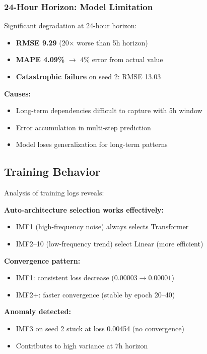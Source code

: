 \documentclass[11pt,a4paper]{article}
\begin{document}
\subsubsection{24-Hour Horizon: Model Limitation}

Significant degradation at 24-hour horizon:
\begin{itemize}
    \item \textbf{RMSE 9.29} (20$\times$ worse than 5h horizon)
    \item \textbf{MAPE 4.09\%} $\rightarrow$ 4\% error from actual value
    \item \textbf{Catastrophic failure} on seed 2: RMSE 13.03
\end{itemize}

\textbf{Causes:}
\begin{itemize}
    \item Long-term dependencies difficult to capture with 5h window
    \item Error accumulation in multi-step prediction
    \item Model loses generalization for long-term patterns
\end{itemize}

\subsection{Training Behavior}

Analysis of training logs reveals:

\textbf{Auto-architecture selection works effectively:}
\begin{itemize}
    \item IMF1 (high-frequency noise) always selects Transformer
    \item IMF2--10 (low-frequency trend) select Linear (more efficient)
\end{itemize}

\textbf{Convergence pattern:}
\begin{itemize}
    \item IMF1: consistent loss decrease ($0.00003 \rightarrow 0.00001$)
    \item IMF2+: faster convergence (stable by epoch 20--40)
\end{itemize}

\textbf{Anomaly detected:}
\begin{itemize}
    \item IMF3 on seed 2 stuck at loss 0.00454 (no convergence)
    \item Contributes to high variance at 7h horizon
\end{itemize}
\end{document}
